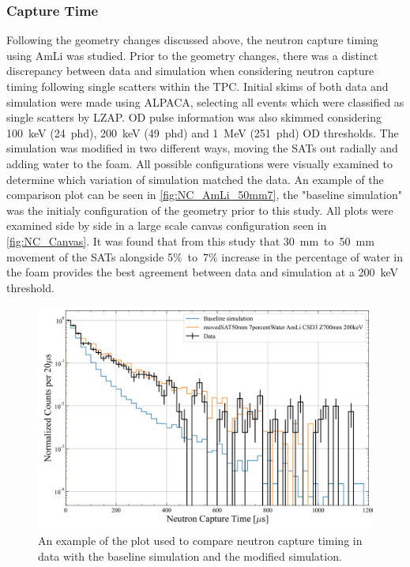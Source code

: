 \subsubsection{Capture Time}
Following the geometry changes discussed above, the neutron capture timing using AmLi was studied. Prior to the geometry changes, there was a distinct discrepancy between data and simulation when considering neutron capture timing following single scatters within the TPC. Initial skims of both data and simulation were made using ALPACA, selecting all events which were classified as single scatters by LZAP. OD pulse information was also skimmed considering 100~keV (24~phd), 200~keV (49~phd) and 1~MeV (251~phd) OD thresholds.
The simulation was modified in two different ways, moving the SATs out radially and adding water to the foam. All possible configurations were visually examined to determine which variation of simulation matched the data. An example of the comparison plot can be seen in \autoref{fig:NC_AmLi_50mm7}, the "baseline simulation" was the initialy configuration of the geometry prior to this study. All plots were examined side by side in a large scale canvas configuration seen in \autoref{fig:NC_Canvas}. It was found that from this study that 30~mm~to~50~mm movement of the SATs alongside 5\%~to~7\% increase in the percentage of water in the foam provides the best agreement between data and simulation at a 200~keV threshold.
\begin{figure}
    \centering
    \includegraphics[width=0.8\linewidth]{figures/VetoEfficiency/movedSAT50mm_7percentWater_AmLi_CSD3_Z700mm_200keV.png}
    \caption{An example of the plot used to compare neutron capture timing in data with the baseline simulation and the modified simulation.}
    \label{fig:NC_AmLi_50mm7}
\end{figure}
